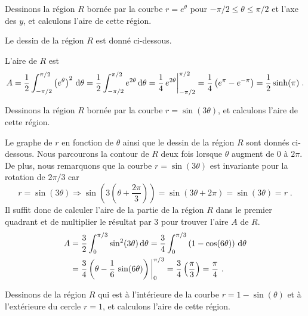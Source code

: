 { 

\begin{egg}
Dessinons la région $R$ bornée par la courbe $r=e^\theta$
pour $-\pi/2 \leq \theta \leq \pi/2$ et l'axe des $y$, et calculons
l'aire de cette région.

Le dessin de la région $R$ est donné ci-dessous.

L'aire de $R$ est
\[
A = \frac{1}{2} \int_{-\pi/2}^{\pi/2} \left( e^\theta \right)^2
\,\mathrm{d}\theta
= \frac{1}{2} \int_{-\pi/2}^{\pi/2} e^{2\theta} \,\mathrm{d}\theta
= \frac{1}{4} \, e^{2\theta} \bigg|_{-\pi/2}^{\pi/2}
= \frac{1}{4} \left( e^\pi-e^{-\pi} \right) = \frac{1}{2} \sinh(\pi) \; .
\]
\end{egg}

\begin{egg}
Dessinons la région $R$ bornée par la courbe
$r=\sin(3\theta)$, et calculons l'aire de cette région.

Le graphe de $r$ en fonction de $\theta$ ainsi que le dessin de la
région $R$ sont donnés ci-dessous.
Nous parcourons la contour de $R$ deux fois lorsque $\theta$ augment de $0$ à
$2\pi$.  De plus, nous remarquons que la courbe $r=\sin(3\theta)$ est
invariante pour la rotation de $2\pi/3$ car
\[
r=\sin\left(3\theta\right) \Rightarrow
\sin\left( 3\left(\theta+\frac{2\pi}{3}\right)\right)
= \sin\left(3\theta + 2\pi\right) = \sin\left(3\theta\right) = r \; .
\]
Il suffit donc de calculer l'aire de la partie de la région $R$ dans
le premier quadrant et de multiplier le résultat par $3$ pour trouver
l'aire $A$ de $R$.
\begin{align*}
A &= \frac{3}{2} \int_0^{\pi/3} \sin^2(3\theta) \,\mathrm{d}\theta
= \frac{3}{4} \int_0^{\pi/3} \left( 1 - \cos(6\theta)\right) \,\mathrm{d}\theta \\
&= \frac{3}{4} \left(\theta - \frac{1}{6} \, \sin(6\theta)\right)
\bigg|_0^{\pi/3}
= \frac{3}{4} \left( \frac{\pi}{3} \right) = \frac{\pi}{4} \ .
\end{align*}
\end{egg}

\begin{egg}
Dessinons de la région $R$ qui est à l'intérieure de la courbe
$r=1-\sin(\theta)$ et à l'extérieure du cercle $r=1$, et calculons l'aire
de cette région.


\end{egg}}
